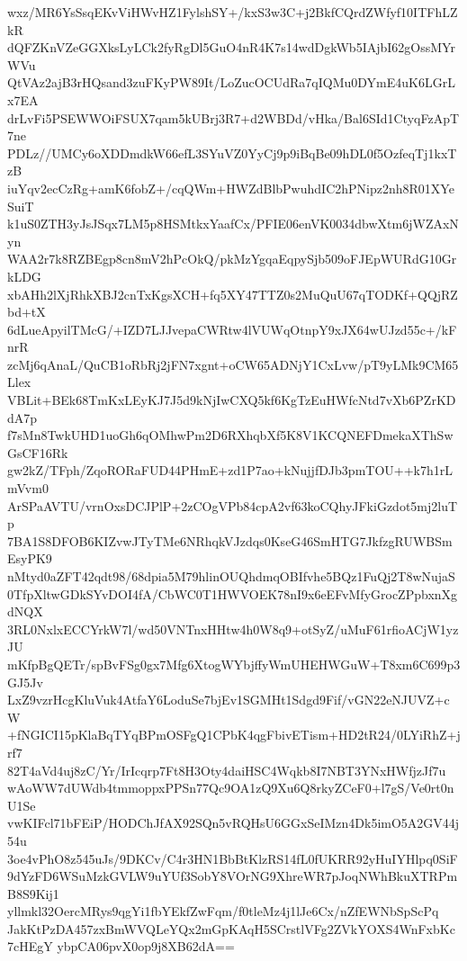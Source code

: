 wxz/MR6YsSsqEKvViHWvHZ1FylshSY+/kxS3w3C+j2BkfCQrdZWfyf10ITFhLZkR
dQFZKnVZeGGXksLyLCk2fyRgDl5GuO4nR4K7s14wdDgkWb5IAjbI62gOssMYrWVu
QtVAz2ajB3rHQsand3zuFKyPW89It/LoZucOCUdRa7qIQMu0DYmE4uK6LGrLx7EA
drLvFi5PSEWWOiFSUX7qam5kUBrj3R7+d2WBDd/vHka/Bal6SId1CtyqFzApT7ne
PDLz//UMCy6oXDDmdkW66efL3SYuVZ0YyCj9p9iBqBe09hDL0f5OzfeqTj1kxTzB
iuYqv2ecCzRg+amK6fobZ+/cqQWm+HWZdBlbPwuhdIC2hPNipz2nh8R01XYeSuiT
k1uS0ZTH3yJsJSqx7LM5p8HSMtkxYaafCx/PFIE06enVK0034dbwXtm6jWZAxNyn
WAA2r7k8RZBEgp8cn8mV2hPcOkQ/pkMzYgqaEqpySjb509oFJEpWURdG10GrkLDG
xbAHh2lXjRhkXBJ2cnTxKgsXCH+fq5XY47TTZ0s2MuQuU67qTODKf+QQjRZbd+tX
6dLueApyilTMcG/+IZD7LJJvepaCWRtw4lVUWqOtnpY9xJX64wUJzd55c+/kFnrR
zcMj6qAnaL/QuCB1oRbRj2jFN7xgnt+oCW65ADNjY1CxLvw/pT9yLMk9CM65Llex
VBLit+BEk68TmKxLEyKJ7J5d9kNjIwCXQ5kf6KgTzEuHWfcNtd7vXb6PZrKDdA7p
f7sMn8TwkUHD1uoGh6qOMhwPm2D6RXhqbXf5K8V1KCQNEFDmekaXThSwGsCF16Rk
gw2kZ/TFph/ZqoRORaFUD44PHmE+zd1P7ao+kNujjfDJb3pmTOU++k7h1rLmVvm0
ArSPaAVTU/vrnOxsDCJPlP+2zCOgVPb84cpA2vf63koCQhyJFkiGzdot5mj2luTp
7BA1S8DFOB6KIZvwJTyTMe6NRhqkVJzdqs0KseG46SmHTG7JkfzgRUWBSmEsyPK9
nMtyd0aZFT42qdt98/68dpia5M79hlinOUQhdmqOBIfvhe5BQz1FuQj2T8wNujaS
0TfpXltwGDkSYvDOI4fA/CbWC0T1HWVOEK78nI9x6eEFvMfyGrocZPpbxnXgdNQX
3RL0NxlxECCYrkW7l/wd50VNTnxHHtw4h0W8q9+otSyZ/uMuF61rfioACjW1yzJU
mKfpBgQETr/spBvFSg0gx7Mfg6XtogWYbjffyWmUHEHWGuW+T8xm6C699p3GJ5Jv
LxZ9vzrHcgKluVuk4AtfaY6LoduSe7bjEv1SGMHt1Sdgd9Fif/vGN22eNJUVZ+cW
+fNGICI15pKlaBqTYqBPmOSFgQ1CPbK4qgFbivETism+HD2tR24/0LYiRhZ+jrf7
82T4aVd4uj8zC/Yr/IrIcqrp7Ft8H3Oty4daiHSC4Wqkb8I7NBT3YNxHWfjzJf7u
wAoWW7dUWdb4tmmoppxPPSn77Qc9OA1zQ9Xu6Q8rkyZCeF0+l7gS/Ve0rt0nU1Se
vwKIFcl71bFEiP/HODChJfAX92SQn5vRQHsU6GGxSeIMzn4Dk5imO5A2GV44j54u
3oe4vPhO8z545uJs/9DKCv/C4r3HN1BbBtKlzRS14fL0fUKRR92yHuIYHlpq0SiF
9dYzFD6WSuMzkGVLW9uYUf3SobY8VOrNG9XhreWR7pJoqNWhBkuXTRPmB8S9Kij1
yllmkl32OercMRys9qgYi1fbYEkfZwFqm/f0tleMz4j1lJe6Cx/nZfEWNbSpScPq
JakKtPzDA457zxBmWVQLeYQx2mGpKAqH5SCrstlVFg2ZVkYOXS4WnFxbKc7cHEgY
ybpCA06pvX0op9j8XB62dA==

